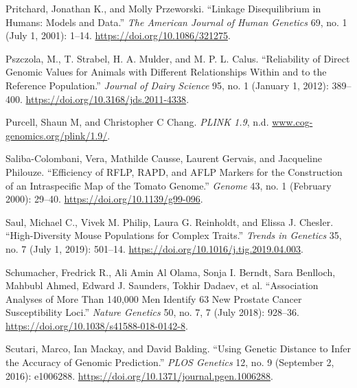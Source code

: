 \documentclass[
]{book}
\newlength{\cslhangindent}
\newlength{\cslentryspacingunit} %
\newenvironment{CSLReferences}[2] %
 {%
  \setlength{\parindent}{0pt}
  \ifodd #1
  \let\oldpar\par
  \def\par{\hangindent=\cslhangindent\oldpar}
  \fi
  \setlength{\parskip}{#2\cslentryspacingunit}
 }%
 {}
\begin{document}
\begin{CSLReferences}{1}{0}
\leavevmode{}%
Pritchard, Jonathan K., and Molly Przeworski. {``Linkage {Disequilibrium} in {Humans}: {Models} and {Data}.''} \emph{The American Journal of Human Genetics} 69, no. 1 (July 1, 2001): 1--14. \url{https://doi.org/10.1086/321275}.

\leavevmode{}%
Pszczola, M., T. Strabel, H. A. Mulder, and M. P. L. Calus. {``Reliability of Direct Genomic Values for Animals with Different Relationships Within and to the Reference Population.''} \emph{Journal of Dairy Science} 95, no. 1 (January 1, 2012): 389--400. \url{https://doi.org/10.3168/jds.2011-4338}.

\leavevmode{}%
Purcell, Shaun M, and Christopher C Chang. \emph{{PLINK} 1.9}, n.d. \href{https://www.cog-genomics.org/plink/1.9/}{www.cog-genomics.org/plink/1.9/}.

\leavevmode{}%
Saliba-Colombani, Vera, Mathilde Causse, Laurent Gervais, and Jacqueline Philouze. {``Efficiency of {RFLP}, {RAPD}, and {AFLP} Markers for the Construction of an Intraspecific Map of the Tomato Genome.''} \emph{Genome} 43, no. 1 (February 2000): 29--40. \url{https://doi.org/10.1139/g99-096}.

\leavevmode{}%
Saul, Michael C., Vivek M. Philip, Laura G. Reinholdt, and Elissa J. Chesler. {``High-{Diversity Mouse Populations} for {Complex Traits}.''} \emph{Trends in Genetics} 35, no. 7 (July 1, 2019): 501--14. \url{https://doi.org/10.1016/j.tig.2019.04.003}.

\leavevmode{}%
Schumacher, Fredrick R., Ali Amin Al Olama, Sonja I. Berndt, Sara Benlloch, Mahbubl Ahmed, Edward J. Saunders, Tokhir Dadaev, et al. {``Association Analyses of More Than 140,000 Men Identify 63 New Prostate Cancer Susceptibility Loci.''} \emph{Nature Genetics} 50, no. 7, 7 (July 2018): 928--36. \url{https://doi.org/10.1038/s41588-018-0142-8}.

\leavevmode{}%
Scutari, Marco, Ian Mackay, and David Balding. {``Using {Genetic Distance} to {Infer} the {Accuracy} of {Genomic Prediction}.''} \emph{PLOS Genetics} 12, no. 9 (September 2, 2016): e1006288. \url{https://doi.org/10.1371/journal.pgen.1006288}.


\end{CSLReferences}
\end{document}
